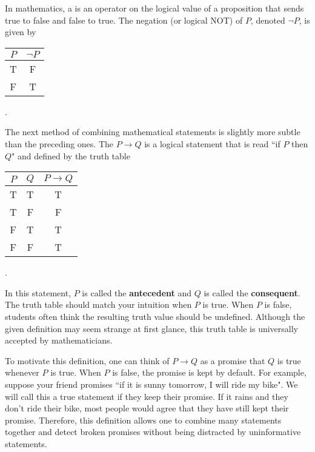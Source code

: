 In mathematics, a  is an operator on the logical value of a proposition that sends true to false and false to true.
The negation (or logical NOT) of $P$, denoted $\neg P$, is given by
\begin{center}
\begin{tabular}{|c|c|}
\hline
$P$ & $\neg P$ \\
\hline
T & F \\
F & T \\
\hline
\end{tabular} .
\end{center}



The next method of combining mathematical statements is slightly more subtle than the preceding ones.
The  $P \rightarrow Q$ is a logical statement that is read ``if $P$ then $Q$" and defined by the truth table
\begin{center}
\begin{tabular}{|c|c|c|}
\hline
$P$ & $Q$ & $P \rightarrow Q$ \\
\hline
T & T & T \\
T & F & F \\
F & T & T \\
F & F & T \\
\hline
\end{tabular} .
\end{center}
In this statement, $P$ is called the \textbf{antecedent} and $Q$ is called the \textbf{consequent}.
The truth table should match your intuition when $P$ is true.
When $P$ is false, students often think the resulting truth value should be undefined.
Although the given definition may seem strange at first glance, this truth table is universally accepted by mathematicians.

To motivate this definition, one can think of $P \rightarrow Q$ as a promise that $Q$ is true whenever $P$ is true.
When $P$ is false, the promise is kept by default.
For example, suppose your friend promises ``if it is sunny tomorrow, I will ride my bike".
We will call this a true statement if they keep their promise.
If it rains and they don't ride their bike, most people would agree that they have still kept their promise.
Therefore, this definition allows one to combine many statements together and detect broken promises without being distracted by uninformative statements.


